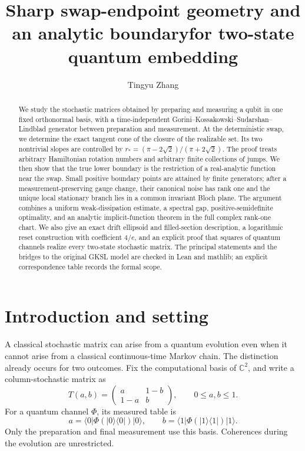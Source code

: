 \documentclass[11pt]{article}
\title{Sharp swap-endpoint geometry and an analytic boundary\newline for two-state quantum embedding}
\author{Tingyu Zhang}
\date{}
\theoremstyle{definition}
\theoremstyle{remark}
\newcommand{\C}{\mathbb C}
\begin{document}
\maketitle
\begin{abstract}
We study the stochastic matrices obtained by preparing and measuring a qubit in one fixed orthonormal basis, with a time-independent Gorini--Kossakowski--Sudarshan--Lindblad generator between preparation and measurement. At the deterministic swap, we determine the exact tangent cone of the closure of the realizable set. Its two nontrivial slopes are controlled by
\(r_*=(\pi-2\sqrt2)/(\pi+2\sqrt2)\).
The proof treats arbitrary Hamiltonian rotation numbers and arbitrary finite collections of jumps. We then show that the true lower boundary is the restriction of a real-analytic function near the swap. Small positive boundary points are attained by finite generators; after a measurement-preserving gauge change, their canonical noise has rank one and the unique local stationary branch lies in a common invariant Bloch plane. The argument combines a uniform weak-dissipation estimate, a spectral gap, positive-semidefinite optimality, and an analytic implicit-function theorem in the full complex rank-one chart. We also give an exact drift ellipsoid and filled-section description, a logarithmic reset construction with coefficient \(4/e\), and an explicit proof that squares of quantum channels realize every two-state stochastic matrix. The principal statements and the bridges to the original GKSL model are checked in Lean and mathlib; an explicit correspondence table records the formal scope.
\end{abstract}

\section{Introduction and setting}\label{sec:introduction}

A classical stochastic matrix can arise from a quantum evolution even when it cannot arise from a classical continuous-time Markov chain. The distinction already occurs for two outcomes. Fix the computational basis of \(\C^2\), and write a column-stochastic matrix as
\begin{equation}\label{eq:stochastic}
 T(a,b)=\begin{pmatrix}a&1-b\\1-a&b\end{pmatrix},\qquad 0\leq a,b\leq1.
\end{equation}
For a quantum channel \(\Phi\), its measured table is
\begin{equation}\label{eq:readout}
 a=\langle0|\Phi(|0\rangle\langle0|)|0\rangle,
 \qquad b=\langle1|\Phi(|1\rangle\langle1|)|1\rangle.
\end{equation}
Only the preparation and final measurement use this basis. Coherences during the evolution are unrestricted.
\end{document}
